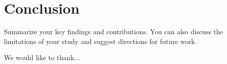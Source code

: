 \documentclass{ecai}
\begin{document}
\section{Conclusion}
\label{sec:conclusion}
Summarize your key findings and contributions. You can also discuss the limitations of your study and suggest directions for future work.

\begin{ack}
We would like to thank... %
\end{ack}


\end{document}
